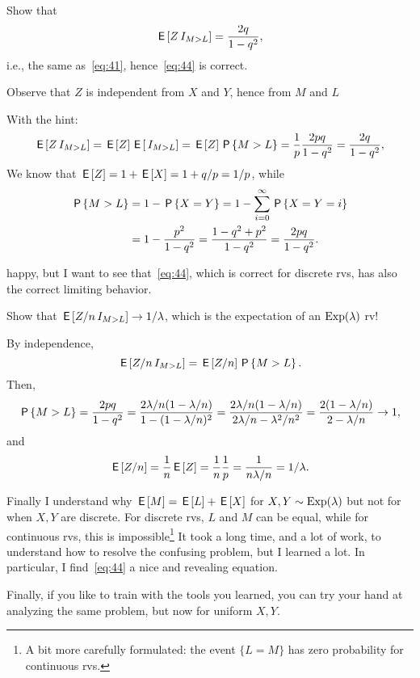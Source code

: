 \begin{exercise}
Show that
\begin{equation*}
\E{Z\1{M>L}} = \frac{2q} {1-q^{2}},
\end{equation*}
i.e., the same as~\cref{eq:41}, hence~\cref{eq:44} is correct.
\begin{hint}
Observe that $Z$   is independent from $X$ and $Y$, hence from $M$ and $L$
\end{hint}
\begin{solution} With the hint:
  \begin{align*}
\E{Z\1{M>L}}  = \E Z \E{\1{M>L}} = \E Z \P{M>L} = \frac 1 p \frac{2pq}{1-q^{2}} = \frac{2q}{1-q^{2}},
  \end{align*}
We know that $\E Z = 1 + \E X = 1 + q/p = 1/p$, while
\begin{align*}
\P{M>L}
&= 1-\P{X=Y} = 1-\sum_{i=0}^{\infty} \P{X=Y=i} \\
&= 1-\frac{p^{2}}{1-q^{2}} = \frac{1 - q^{2} + p^{2}}{1-q^{2}} = \frac{2pq}{1-q^{2}}.
\end{align*}
\end{solution}
\end{exercise}


 happy, but I want to see that~\eqref{eq:44}, which is correct for discrete rvs, has also the correct limiting behavior.
\begin{exercise}
Show that $\E{Z/n\1{M>L}} \to 1/\lambda$, which is the expectation of an $\Exp{\lambda}$ rv!
\begin{solution}
By independence,
  \begin{equation*}
\E{Z/n\1{M>L}} = \E{Z/n} \P{M>L}.
  \end{equation*}
Then,
\begin{equation*}
\P{M>L}   = \frac{2pq}{1-q^{2}}
= \frac{2\lambda/n (1-\lambda/n)}{1-(1-\lambda/n)^{2}}
= \frac{2\lambda/n (1-\lambda/n)}{2\lambda/n -\lambda^{2}/n^{2}}
= \frac{2 (1-\lambda/n)}{2 -\lambda/n}  \to 1,
\end{equation*}
and
\begin{equation*}
\E{Z/n} = \frac 1 n \E Z = \frac 1 n \frac 1 p = \frac 1 {n \lambda/ n} = 1/\lambda.
\end{equation*}
\end{solution}
\end{exercise}

Finally I understand why  $\E M = \E L + \E X$ for $X,Y\sim \Exp{\lambda}$ but not for when $X, Y$ are discrete. For discrete rvs, $L$ and $M$ can be equal, while for continuous rvs, this is impossible\footnote{A bit more carefully formulated: the event $\{L=M\}$ has zero probability for continuous rvs.} It took a long time, and a lot of work, to understand how to resolve the confusing problem, but I learned a lot.
In particular, I find~\cref{eq:44} a nice and revealing equation.

Finally, if you like to train with the  tools you learned,  you can try your hand at analyzing the same problem, but now for uniform $X, Y$.



